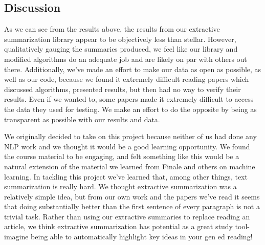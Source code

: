 \documentclass[11pt]{article}
\begin{document}
\subsection{Discussion}
As we can see from the results above, the results from our extractive summarization library appear to be objectively less than stellar. However, qualitatively gauging the summaries produced, we feel like our library and modified algorithms do an adequate job and are likely on par with others out there. Additionally, we've made an effort to make our data as open as possible, as well as our code, because we found it extremely difficult reading papers which discussed algorithms, presented results, but then had no way to verify their results. Even if we wanted to, some papers made it extremely difficult to access the data they used for testing. We make an effort to do the opposite by being as transparent as possible with our results and data.

We originally decided to take on this project because neither of us had done any NLP work and we thought it would be a good learning opportunity. We found the course material to be engaging, and felt something like this would be a natural extension of the material we learned from Finale and others on machine learning. In tackling this project we've learned that, among other things, text summarization is really hard. We thought extractive summarization was a relatively simple idea, but from our own work and the papers we've read it seems that doing substantially better than the first sentence of every paragraph is not a trivial task. Rather than using our extractive summaries to replace reading an article, we think extractive summarization has potential as a great study tool-imagine being able to automatically highlight key ideas in your gen ed reading!
\end{document}
